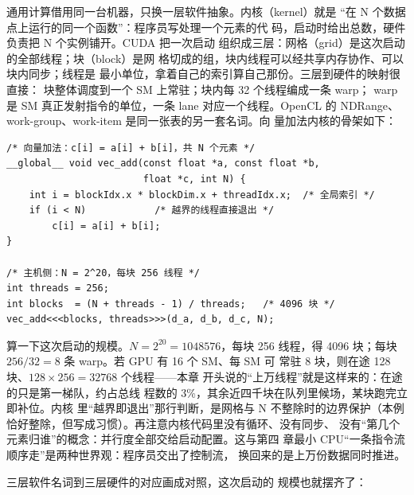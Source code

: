 通用计算借用同一台机器，只换一层软件抽象。内核（kernel）就是
“在 N 个数据点上运行的同一个函数”：程序员写处理一个元素的代
码，启动时给出总数，硬件负责把 N 个实例铺开。CUDA 把一次启动
组织成三层：网格（grid）是这次启动的全部线程；块（block）是网
格切成的组，块内线程可以经共享内存协作、可以块内同步；线程是
最小单位，拿着自己的索引算自己那份。三层到硬件的映射很直接：
块整体调度到一个 SM 上常驻；块内每 32 个线程编成一条 warp；
warp 是 SM 真正发射指令的单位，一条 lane 对应一个线程。OpenCL
的 NDRange、work-group、work-item 是同一张表的另一套名词。向
量加法内核的骨架如下：

\begin{lstlisting}
/* 向量加法：c[i] = a[i] + b[i]，共 N 个元素 */
__global__ void vec_add(const float *a, const float *b,
                        float *c, int N) {
    int i = blockIdx.x * blockDim.x + threadIdx.x;  /* 全局索引 */
    if (i < N)            /* 越界的线程直接退出 */
        c[i] = a[i] + b[i];
}

/* 主机侧：N = 2^20，每块 256 线程 */
int threads = 256;
int blocks  = (N + threads - 1) / threads;   /* 4096 块 */
vec_add<<<blocks, threads>>>(d_a, d_b, d_c, N);
\end{lstlisting}

算一下这次启动的规模。$N=2^{20}=1048576$，每块 256 线程，得
4096 块；每块 $256/32=8$ 条 warp。若 GPU 有 16 个 SM、每 SM 可
常驻 8 块，则在途 128 块、$128\times256=32768$ 个线程——本章
开头说的“上万线程”就是这样来的：在途的只是第一梯队，约占总线
程数的 3\%，其余近四千块在队列里候场，某块跑完立即补位。内核
里“越界即退出”那行判断，是网格与 N 不整除时的边界保护（本例
恰好整除，但写成习惯）。再注意内核代码里没有循环、没有同步、
没有“第几个元素归谁”的概念：并行度全部交给启动配置。这与第四
章最小 CPU“一条指令流顺序走”是两种世界观：程序员交出了控制流，
换回来的是上万份数据同时推进。

三层软件名词到三层硬件的对应画成对照，这次启动的
规模也就摆齐了：

